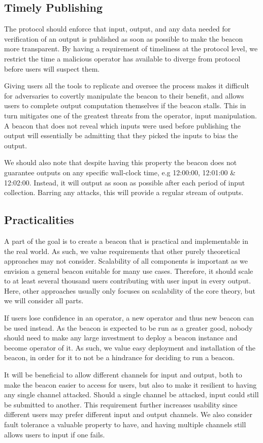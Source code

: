 \subsection{Timely Publishing}\label{sec:timely_publishing}
The protocol should enforce that input, output, and any data needed for verification of an output is published as soon as possible to make the beacon more transparent.
By having a requirement of timeliness at the protocol level, we restrict the time a malicious operator has available to diverge from protocol before users will suspect them.

Giving users all the tools to replicate and oversee the process makes it difficult for adversaries to covertly manipulate the beacon to their benefit, and allows users to complete output computation themselves if the beacon stalls.
This in turn mitigates one of the greatest threats from the operator, input manipulation.
A beacon that does not reveal which inputs were used before publishing the output will essentially be admitting that they picked the inputs to bias the output.

We should also note that despite having this property the beacon does not guarantee outputs on any specific wall-clock time, e.g 12:00:00, 12:01:00 \& 12:02:00. Instead, it will output as soon as possible after each period of input collection. Barring any attacks, this will provide a regular stream of outputs.

\subsection{Practicalities}\label{sec:practical}
A part of the goal is to create a beacon that is practical and implementable in the real world.
As such, we value requirements that other purely theoretical approaches may not consider.
Scalability of all components is important as we envision a general beacon suitable for many use cases.
Therefore, it should scale to at least several thousand users contributing with user input in every output.
Here, other approaches usually only focuses on scalability of the core theory, but we will consider all parts.

If users lose confidence in an operator, a new operator and thus new beacon can be used instead.
As the beacon is expected to be run as a greater good, nobody should need to make any large investment to deploy a beacon instance and become operator of it.
As such, we value easy deployment and installation of the beacon, in order for it to not be a hindrance for deciding to run a beacon.

It will be beneficial to allow different channels for input and output, both to make the beacon easier to access for users, but also to make it resilient to having any single channel attacked.
Should a single channel be attacked, input could still be submitted to another.
This requirement further increases usability since different users may prefer different input and output channels.
We also consider fault tolerance a valuable property to have, and having multiple channels still allows users to input if one fails.
